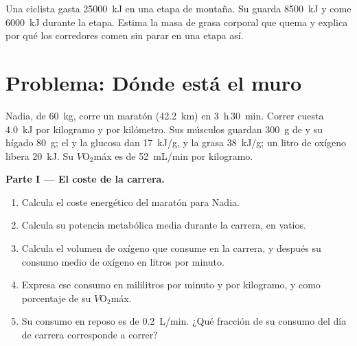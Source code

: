\begin{exercise}[$\star\star\star$]\label{exo:g10:exercise-and-energy:15}
Una ciclista gasta \qty{25000}{kJ} en una etapa de montaña. Su
 guarda \qty{8500}{kJ} y come \qty{6000}{kJ} durante la etapa.
Estima la masa de grasa corporal que quema y explica por qué los
corredores comen sin parar en una etapa así.
\end{exercise}

\section{Problema: Dónde está el muro}

\begin{problem}
\label{pb:g10:exercise-and-energy:1}
Nadia, de \qty{60}{kg}, corre un maratón (\qty{42.2}{km}) en
\qty{3}{h}\,\qty{30}{min}. Correr cuesta \qty{4.0}{kJ} por kilogramo y
por kilómetro. Sus músculos guardan \qty{300}{g} de  y su
hígado \qty{80}{g}; el  y la glucosa dan \qty{17}{kJ/g}, y la
grasa \qty{38}{kJ/g}; un litro de oxígeno libera \qty{20}{kJ}. Su
$\dot V\!\mathrm{O_2}$máx es de \qty{52}{mL/min} por kilogramo.

\medskip
\noindent\textbf{Parte I --- El coste de la carrera.}
\begin{enumerate}
  \item Calcula el coste energético del maratón para Nadia.
  \item Calcula su potencia metabólica media durante la carrera, en
        vatios.
  \item Calcula el volumen de oxígeno que consume en la carrera, y
        después su consumo medio de oxígeno en litros por minuto.
  \item Expresa ese consumo en mililitros por minuto y por kilogramo, y
        como porcentaje de su $\dot V\!\mathrm{O_2}$máx.
  \item Su consumo en reposo es de \qty{0.2}{L/min}. ¿Qué fracción de
        su consumo del día de carrera corresponde a correr?
\end{enumerate}


\end{problem}
